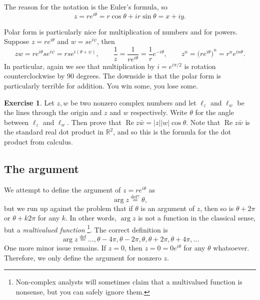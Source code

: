 \documentclass[12pt,openany]{book}
\renewcommand{\Re}{\operatorname{Re}}
\newcommand{\sabs}[1]{\lvert {#1} \rvert}
\newcommand{\R}{{\mathbb{R}}}
\newcommand{\myindex}[1]{#1\index{#1}}
\theoremstyle{plain}
\theoremstyle{remark}
\theoremstyle{definition}
\newenvironment{exbox}{%
    \def\FrameCommand{\vrule width 1pt \relax\hspace{10pt}}%
    \MakeFramed{\advance\hsize-\width\FrameRestore}%
}{%
    \endMakeFramed
}
\theoremstyle{exercise}
\newtheorem{exercise}{Exercise}[section]
\theoremstyle{example}
\begin{document}
The reason for the notation is the
Euler's formula, so
\begin{equation*}
z = r e^{i\theta} = r\cos \theta + i r\sin \theta  = x+iy .
\end{equation*}

Polar form is particularly nice for multiplication of numbers and for powers.
Suppose $z = r e^{i\theta}$ and $w = s e^{i \psi}$, then
\begin{equation*}
zw =
r e^{i \theta} s e^{i \psi} = 
rs e^{i (\theta+ \psi)},
\qquad
\frac{1}{z} =
\frac{1}{r e^{i \theta}} =
\frac{1}{r} e^{-i \theta} ,
\qquad
z^n =
{\bigl(r e^{i \theta}\bigr)}^n =
r^n e^{i n\theta} .
\end{equation*}
In particular, again we see that multiplication by $i = e^{i \pi / 2}$ is
rotation counterclockwise by $90$ degrees.
The downside is that the polar form is particularly terrible for addition.
You win some, you lose some.

\begin{exbox}
\begin{exercise}
Let $z,w$ be two nonzero complex numbers and let
$\ell_z$ and $\ell_w$ be the lines through the origin and
$z$ and $w$ respectively.  Write $\theta$ for the angle between $\ell_z$ and
$\ell_w$.  Then prove that
$\Re z\bar{w} = \sabs{z} \sabs{w} \cos \theta$.
Note that $\Re z\bar{w}$ is the standard real dot product in $\R^2$, and so
this is the formula for the dot product from calculus.
\end{exercise}
\end{exbox}

\subsection{The argument}

We attempt to define the argument of $z = re^{i\theta}$ as
%
\begin{equation*}
\arg z
\overset{\text{def?}}{=}
\theta ,
\end{equation*}
but we run up against the problem that if $\theta$ is an argument of $z$,
then so is $\theta+2\pi$ or $\theta + k 2\pi$ for any $k$.  In other words,
$\arg z$ is not a function in the classical sense, but a
\emph{\myindex{multivalued function}}%
\footnote{Non-complex analysts will sometimes claim that a multivalued
function is nonsense, but you can safely ignore them.}.  The correct
definition is
\begin{equation*}
\arg z
\overset{\text{def}}{=}
\ldots,\theta - 4\pi,
\theta - 2\pi,
\theta ,
\theta + 2\pi,
\theta + 4\pi, \ldots
\end{equation*}
One more minor issue remains.  If $z=0$, then $z=0=0 e^{i\theta}$ for any
$\theta$ whatsoever.  Therefore, we only define the argument for nonzero
$z$.
\end{document}
